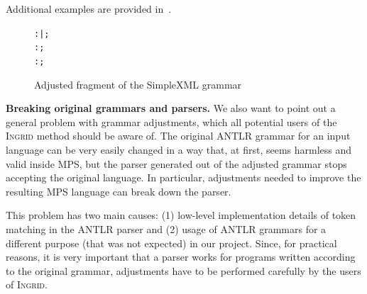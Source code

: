 Additional examples are provided in~\cite{ref:TRFULL}.

\begin{figure}[ht]
\begin{alltt}
\small
   :     |     ;
   : \antlrregex{~["]*} ;
   : \antlrregex{~[']*} ;
\end{alltt}
\caption{Adjusted fragment of the SimpleXML grammar}
\label{fig:XMLADJUST}
\end{figure}

\noindent\textbf{Breaking original grammars and parsers.}
We also want to point out a general problem with grammar adjustments, which all potential users of the \textsc{Ingrid} method should be aware of.
The original ANTLR grammar for an input language can be very easily changed in a way that, at first, seems harmless and valid inside MPS, but the parser generated out of the adjusted grammar stops accepting the original language.
In particular, adjustments needed to improve the resulting MPS language can break down the parser.

This problem has two main causes: (1) low-level implementation details of token matching in the ANTLR parser and (2) usage of ANTLR grammars for a different purpose (that was not expected) in our project.
Since, for practical reasons, it is very important that a parser works for programs written according to the original grammar, adjustments have to be performed carefully by the users of \textsc{Ingrid}.

